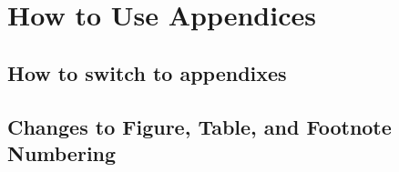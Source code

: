 \section{How to Use Appendices}


\subsection{How to switch to appendixes}


\subsection{Changes to Figure, Table, and Footnote Numbering}
